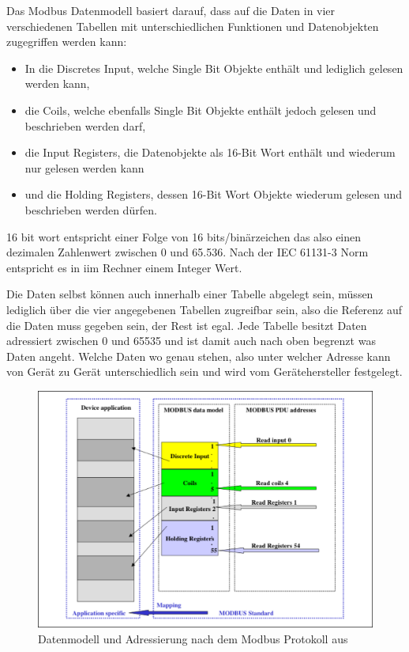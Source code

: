 Das Modbus Datenmodell basiert darauf, dass auf die Daten in vier verschiedenen Tabellen mit unterschiedlichen Funktionen und Datenobjekten zugegriffen werden kann:
\begin{itemize}
	\item In die Discretes Input, welche Single Bit Objekte enthält und lediglich gelesen werden kann,
	\item die Coils, welche ebenfalls Single Bit Objekte enthält jedoch gelesen und beschrieben werden darf,
	\item die Input Registers, die Datenobjekte als 16-Bit Wort enthält und wiederum nur gelesen werden kann
	\item und die Holding Registers, dessen 16-Bit Wort Objekte wiederum gelesen und beschrieben werden dürfen.
\end{itemize}

16 bit wort entspricht einer Folge von 16 bits/binärzeichen das also einen dezimalen Zahlenwert zwischen 0 und 65.536. Nach der IEC 61131-3 Norm entspricht es in iim Rechner einem Integer Wert.

Die Daten selbst können auch innerhalb einer Tabelle abgelegt sein, müssen lediglich über die vier angegebenen Tabellen zugreifbar sein, also die Referenz auf die Daten muss gegeben sein, der Rest ist egal. Jede Tabelle besitzt Daten adressiert zwischen 0 und 65535 und ist damit auch nach oben begrenzt was Daten angeht. Welche Daten wo genau stehen, also unter welcher Adresse kann von Gerät zu Gerät unterschiedlich sein und wird vom Gerätehersteller festgelegt. \cite[S.~6ff.]{mod12}

\begin{figure}
\centering
\includegraphics[width=\textwidth]{abbildungen/20160319_modbusadresse}
\caption[Datenmodell und Adressierung nach dem Modbus Protokoll]{Datenmodell und Adressierung nach dem Modbus Protokoll aus \cite[S.~8]{mod12}}
\label{fig:modbusadresse}
\end{figure}


